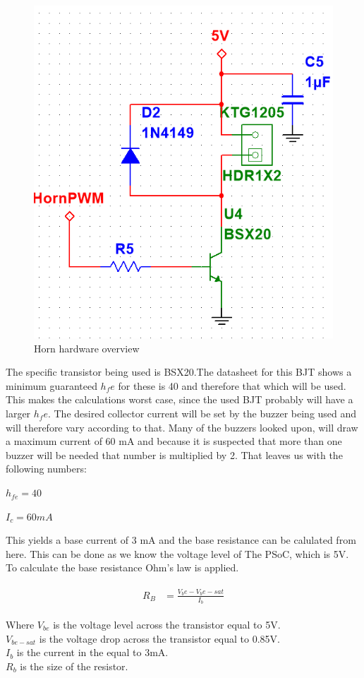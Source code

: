 \begin{figure}[H]
	\centering
	\includegraphics[width=0.5\linewidth]{Hardware/Pictures/Horn_hw}
	\caption{Horn hardware overview}
	\label{fig:Horn_control}
\end{figure}

The specific transistor being used is BSX20.The datasheet \cite{BSX20} for this BJT shows a minimum guaranteed $h_fe$ for these is 40 and therefore that which will be used. This makes the calculations worst case, since the used BJT probably will have a larger $h_fe$. The desired collector current will be set by the buzzer being used and will therefore vary according to that. Many of the buzzers looked upon, will draw a maximum current of 60 mA and because it is suspected that more than one buzzer will be needed that number is multiplied by 2. That leaves us with the following numbers:

$h_{fe} = 40 $ 

$I_c = 60 mA$

This yields a base current of 3 mA and the base resistance can be calulated from here. This can be done as we know the voltage level of The PSoC, which is 5V. \\
To calculate the base resistance Ohm's law is applied. 

\begin{align}
	\begin{split}
		R_B &= \frac{V_be - V_be-sat}{I_b}
	\end{split}
\end{align}

Where $V_{be}$ is the voltage level across the transistor equal to 5V. \\ 
$V_{be-sat}$ is the voltage drop across the transistor equal to 0.85V. \\ 
$I_b$ is the current in the equal to 3mA.  \\
$R_b$ is the size of the resistor. \\ 

